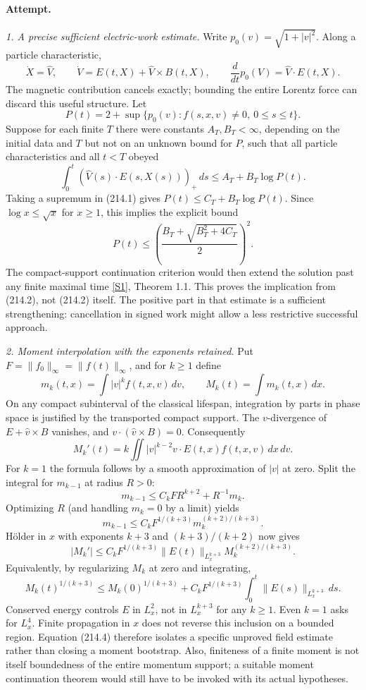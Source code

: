 \documentclass[11pt,a4paper]{article}
\newcommand{\sref}[2]{\hyperlink{source:#1:#2}{[S#2]}}
\begin{document}
\paragraph{Attempt.}
\textit{1. A precise sufficient electric-work estimate.}
Write $p_0(v)=\sqrt{1+|v|^2}$. Along a particle characteristic,
\[
 \dot X=\widehat V,\qquad \dot V=E(t,X)+\widehat V\times B(t,X),
 \qquad \frac{d}{dt}p_0(V)=\widehat V\cdot E(t,X).              \tag{214.1}
\]
The magnetic contribution cancels exactly; bounding the entire Lorentz force
can discard this useful structure. Let
\[
 P(t)=2+\sup\{p_0(v):f(s,x,v)\ne0,\ 0\le s\le t\}.
\]
Suppose for each finite $T$ there were constants $A_T,B_T<\infty$, depending
on the initial data and $T$ but not on an unknown bound for $P$, such that
all particle characteristics and all $t<T$ obeyed
\[
 \int_0^t(\widehat V(s)\cdot E(s,X(s)))_+\,ds
       \le A_T+B_T\log P(t).                                 \tag{214.2}
\]
Taking a supremum in (214.1) gives $P(t)\le C_T+B_T\log P(t)$.
Since $\log x\le\sqrt x$ for $x\ge1$, this implies the explicit bound
\[
 P(t)\le\left(\frac{B_T+\sqrt{B_T^2+4C_T}}2\right)^2.
\]
The compact-support continuation criterion would then extend the solution
past any finite maximal time \sref{30006039}{1}, Theorem 1.1. This proves the
implication from (214.2), not (214.2) itself. The positive part in that
estimate is a sufficient strengthening: cancellation in signed work might
allow a less restrictive successful approach.

\textit{2. Moment interpolation with the exponents retained.}
Put $F=\|f_0\|_\infty=\|f(t)\|_\infty$, and for $k\ge1$ define
\[
 m_k(t,x)=\int|v|^k f(t,x,v)\,dv,\qquad M_k(t)=\int m_k(t,x)\,dx.
\]
On any compact subinterval of the classical lifespan, integration by parts
in phase space is justified by the transported compact support. The
$v$-divergence of $E+\widehat v\times B$ vanishes, and
$v\cdot(\widehat v\times B)=0$. Consequently
\[
 M_k'(t)=k\iint |v|^{k-2}v\cdot E(t,x)f(t,x,v)\,dx\,dv.
                                                               \tag{214.3}
\]
For $k=1$ the formula follows by a smooth approximation of $|v|$ at zero.
Split the integral for $m_{k-1}$ at radius $R>0$:
\[
 m_{k-1}\le C_k F R^{k+2}+R^{-1}m_k.
\]
Optimizing $R$ (and handling $m_k=0$ by a limit) yields
\[
 m_{k-1}\le C_kF^{1/(k+3)}m_k^{(k+2)/(k+3)}.
\]
H\"older in $x$ with exponents $k+3$ and $(k+3)/(k+2)$ now gives
\[
 |M_k'|\le C_kF^{1/(k+3)}\|E(t)\|_{L^{k+3}_x}
                     M_k^{(k+2)/(k+3)}.
\]
Equivalently, by regularizing $M_k$ at zero and integrating,
\[
 M_k(t)^{1/(k+3)}\le M_k(0)^{1/(k+3)}+
 C_k F^{1/(k+3)}\int_0^t\|E(s)\|_{L^{k+3}_x}\,ds.             \tag{214.4}
\]
Conserved energy controls $E$ in $L^2_x$, not in $L^{k+3}_x$ for any
$k\ge1$. Even $k=1$ asks for $L^4_x$. Finite propagation in $x$ does not
reverse this inclusion on a bounded region. Equation (214.4) therefore
isolates a specific unproved field estimate rather than closing a moment
bootstrap. Also, finiteness of a finite moment is not itself boundedness of
the entire momentum support; a suitable moment continuation theorem would
still have to be invoked with its actual hypotheses.
\end{document}
